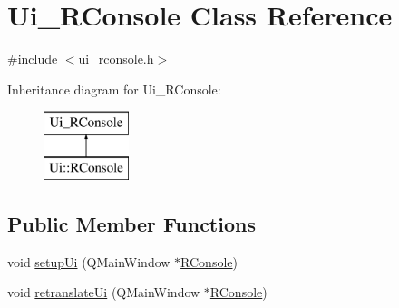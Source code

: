 \hypertarget{class_ui___r_console}{}\section{Ui\+\_\+\+R\+Console Class Reference}
\label{class_ui___r_console}


{\ttfamily \#include $<$ui\+\_\+rconsole.\+h$>$}

Inheritance diagram for Ui\+\_\+\+R\+Console\+:\begin{figure}[H]
\begin{center}
\leavevmode
\includegraphics[height=2.000000cm]{d0/dc6/class_ui___r_console}
\end{center}
\end{figure}
\subsection*{Public Member Functions}
\begin{DoxyCompactItemize}
\item 
void \mbox{\hyperlink{class_ui___r_console_a2df0458dc50701360bbf16f2c7e4b7e4}{setup\+Ui}} (Q\+Main\+Window $\ast$\mbox{\hyperlink{class_r_console}{R\+Console}})
\item 
void \mbox{\hyperlink{class_ui___r_console_a1f0b0cbeabd273ef19d2b1326c27ed8e}{retranslate\+Ui}} (Q\+Main\+Window $\ast$\mbox{\hyperlink{class_r_console}{R\+Console}})
\end{DoxyCompactItemize}
